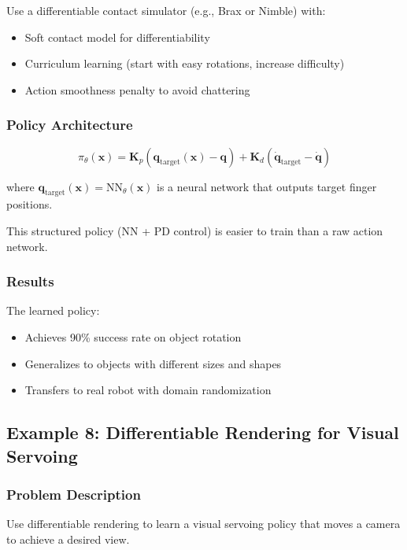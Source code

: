 Use a differentiable contact simulator (e.g., Brax or Nimble) with:
\begin{itemize}
    \item Soft contact model for differentiability
    \item Curriculum learning (start with easy rotations, increase difficulty)
    \item Action smoothness penalty to avoid chattering
\end{itemize}

\subsubsection{Policy Architecture}

\begin{equation}
\pi_\theta(\mathbf{x}) = \mathbf{K}_p (\mathbf{q}_{\text{target}}(\mathbf{x}) - \mathbf{q}) + \mathbf{K}_d (\dot{\mathbf{q}}_{\text{target}} - \dot{\mathbf{q}})
\end{equation}

where $\mathbf{q}_{\text{target}}(\mathbf{x}) = \text{NN}_\theta(\mathbf{x})$ is a neural network that outputs target finger positions.

This structured policy (NN + PD control) is easier to train than a raw action network.

\subsubsection{Results}

The learned policy:
\begin{itemize}
    \item Achieves 90\% success rate on object rotation
    \item Generalizes to objects with different sizes and shapes
    \item Transfers to real robot with domain randomization
\end{itemize}

\subsection{Example 8: Differentiable Rendering for Visual Servoing}

\subsubsection{Problem Description}

Use differentiable rendering to learn a visual servoing policy that moves a camera to achieve a desired view.

